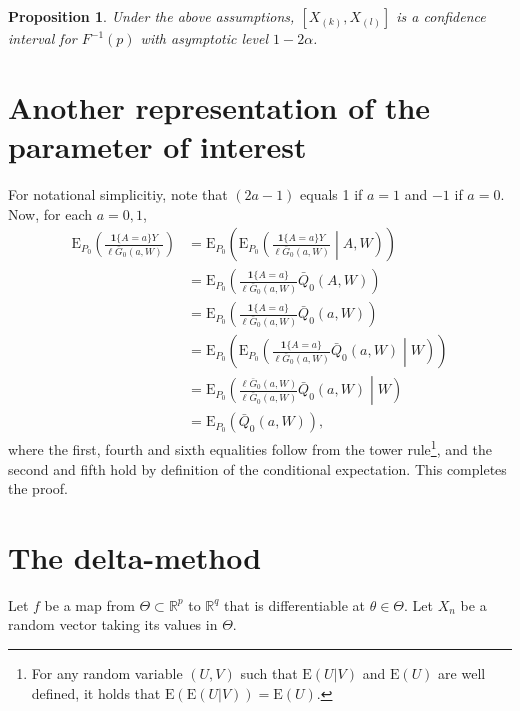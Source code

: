 \documentclass[
  11pt,
  openright,twoside]{book}
\newcommand{\bbR}{\mathbb{R}}
\newcommand{\Exp}{\textrm{E}}
\newcommand{\Gbar}{\bar{G}}
\newcommand{\one}{\textbf{1}}
\newcommand{\Qbar}{\bar{Q}}
\newtheorem{proposition}{Proposition}[chapter]
\theoremstyle{definition}
\theoremstyle{definition}
\theoremstyle{definition}
\theoremstyle{definition}
\theoremstyle{remark}
\begin{document}
\begin{proposition}
\protect\hypertarget{prp:unnamed-chunk-5}{}\label{prp:unnamed-chunk-5}Under the above assumptions, \([X_{(k)},X_{(l)}]\) is a confidence interval for
\(F^{-1}(p)\) with asymptotic level \(1 - 2\alpha\).
\end{proposition}

\hypertarget{another-rep}{%
\section{Another representation of the parameter of interest}\label{another-rep}}

For notational simplicitiy, note that \((2a-1)\) equals 1 if \(a=1\) and \(-1\) if
\(a=0\). Now, for each \(a = 0,1\), \begin{align*}
\Exp_{P_{0}}\left(\frac{\one\{A    =    a\}Y}{\ell\Gbar_{0}(a,W)}\right)    &=
\Exp_{P_{0}}\left(\Exp_{P_{0}}\left(\frac{\one\{A  = a\}Y}{\ell\Gbar_{0}(a,W)}
\middle|  A,  W  \right)   \right)  \\  &=  \Exp_{P_{0}}\left(\frac{\one\{A  =
a\}}{\ell\Gbar_{0}(a,W)}      \Qbar_{0}(A,      W)     \right)      \\      &=
\Exp_{P_{0}}\left(\frac{\one\{A   =    a\}}{\ell\Gbar_{0}(a,W)}   \Qbar_{0}(a,
W)\right)    \\    &=   \Exp_{P_{0}}\left(\Exp_{P_{0}}\left(\frac{\one\{A    =
a\}}{\ell\Gbar_{0}(a,W)}  \Qbar_{0}(a, W)  \middle|  W \right)  \right) \\&  =
\Exp_{P_{0}}\left(\frac{\ell\Gbar_{0}(a,W)}{\ell\Gbar_{0}(a,W)}   \Qbar_{0}(a,
W)  \middle| W  \right) \\&  =  \Exp_{P_{0}} \left(  \Qbar_{0}(a, W)  \right),
\end{align*} where the first, fourth and sixth equalities follow from the
tower rule\footnote{For any random variable \((U,V)\) such that \(\Exp(U|V)\) and
  \(\Exp(U)\) are well defined, it holds that \(\Exp(\Exp(U|V)) = \Exp(U)\).}, and
the second and fifth hold by definition of the conditional expectation. This
completes the proof.

\hypertarget{prop-delta-method}{%
\section{The delta-method}\label{prop-delta-method}}

Let \(f\) be a map from \(\Theta \subset \bbR^{p}\) to \(\bbR^{q}\) that is
differentiable at \(\theta\in \Theta\). Let \(X_{n}\) be a random vector taking its
values in \(\Theta\).
\end{document}
